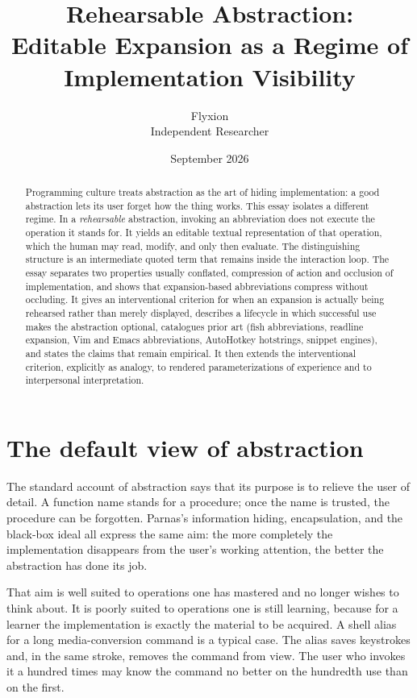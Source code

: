\documentclass[11pt]{article}
\title{Rehearsable Abstraction:\\ Editable Expansion as a Regime of Implementation Visibility}
\author{Flyxion\\ \small Independent Researcher}
\date{September 2026}
\theoremstyle{remark}
\begin{document}
\maketitle

\begin{abstract}
\noindent Programming culture treats abstraction as the art of hiding implementation: a good abstraction lets its user forget how the thing works. This essay isolates a different regime. In a \emph{rehearsable} abstraction, invoking an abbreviation does not execute the operation it stands for. It yields an editable textual representation of that operation, which the human may read, modify, and only then evaluate. The distinguishing structure is an intermediate quoted term that remains inside the interaction loop. The essay separates two properties usually conflated, compression of action and occlusion of implementation, and shows that expansion-based abbreviations compress without occluding. It gives an interventional criterion for when an expansion is actually being rehearsed rather than merely displayed, describes a lifecycle in which successful use makes the abstraction optional, catalogues prior art (fish abbreviations, readline expansion, Vim and Emacs abbreviations, AutoHotkey hotstrings, snippet engines), and states the claims that remain empirical. It then extends the interventional criterion, explicitly as analogy, to rendered parameterizations of experience and to interpersonal interpretation.
\end{abstract}

\section{The default view of abstraction}

The standard account of abstraction says that its purpose is to relieve the user of detail. A function name stands for a procedure; once the name is trusted, the procedure can be forgotten. Parnas's information hiding, encapsulation, and the black-box ideal all express the same aim: the more completely the implementation disappears from the user's working attention, the better the abstraction has done its job.

That aim is well suited to operations one has mastered and no longer wishes to think about. It is poorly suited to operations one is still learning, because for a learner the implementation is exactly the material to be acquired. A shell alias for a long media-conversion command is a typical case. The alias saves keystrokes and, in the same stroke, removes the command from view. The user who invokes it a hundred times may know the command no better on the hundredth use than on the first.
\end{document}
